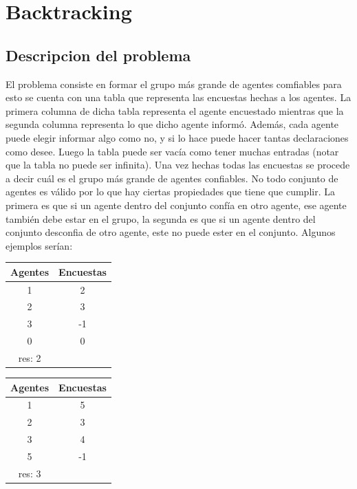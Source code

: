 \section{Backtracking}

\subsection{Descripcion del problema}

	El problema consiste en formar el grupo más grande de agentes comfiables para esto se cuenta con una tabla que representa las encuestas hechas a los agentes. La primera columna de dicha tabla representa el agente encuestado mientras que la segunda columna representa lo que dicho agente informó. Además, cada agente puede elegir informar algo como no, y si lo hace puede hacer tantas declaraciones como desee. Luego la tabla puede ser vacía como tener muchas entradas (notar que la tabla no puede ser infinita). Una vez hechas todas las encuestas se procede a decir cuál es el grupo más grande de agentes confiables. No todo conjunto de agentes es válido por lo que hay ciertas propiedades que tiene que cumplir. La primera es que si un agente dentro del conjunto confía en otro agente, ese agente también debe estar en el grupo, la segunda es que si un agente dentro del conjunto desconfia de otro agente, este no puede ester en el conjunto. Algunos ejemplos serían:
	
\begin{table}[H]
\begin{tabular}{c c}
Agentes & Encuestas  \\ [0.5ex]
\hline
1 & 2 \\
2 & 3 \\
3 & -1 \\
0 & 0 \\ [1ex]
\hline
res: 2 \\
\end{tabular}
\end{table}

\begin{table}[h]
\begin{tabular}{c c}
\centering
Agentes & Encuestas \\ [0.5ex]
\hline
1 & 5 \\
2 & 3 \\
3 & 4 \\
5 & -1 \\ [1ex]
\hline
res: 3 \\
\end{tabular}
\end{table}

